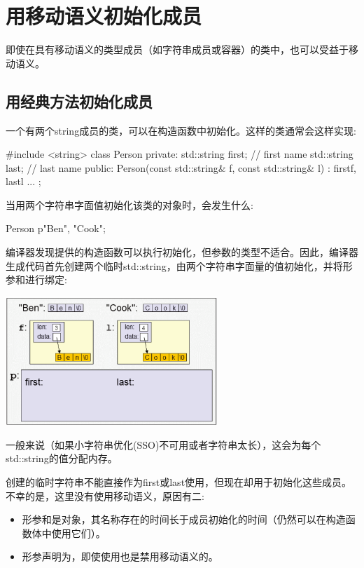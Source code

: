 \section{用移动语义初始化成员}
即使在具有移动语义的类型成员（如字符串成员或容器）的类中，也可以受益于移动语义。

\subsection{用经典方法初始化成员}

一个有两个string成员的类，可以在构造函数中初始化。这样的类通常会这样实现:

\begin{cppcode}
#include <string>
class Person {
private:
	std::string first; // first name
	std::string last; // last name
public:
	Person(const std::string& f, const std::string& l)
	: first{f}, last{l} {
	}
	...
};
\end{cppcode}

当用两个字符串字面值初始化该类的对象时，会发生什么:

\begin{cppcode}
Person p{"Ben", "Cook"};
\end{cppcode}

编译器发现提供的构造函数可以执行初始化，但参数的类型不适合。因此，编译器生成代码首先创建两个临时std::string，由两个字符串字面量的值初始化，并将形参和进行绑定:

\begin{center}
	\includegraphics[width=0.6\textwidth]{part1/ch4/images/1}
\end{center}

一般来说（如果小字符串优化(SSO)不可用或者字符串太长），这会为每个std::string的值分配内存。

创建的临时字符串不能直接作为first或last使用，但现在却用于初始化这些成员。不幸的是，这里没有使用移动语义，原因有二:

\begin{itemize}
	\item 形参和是对象，其名称存在的时间长于成员初始化的时间（仍然可以在构造函数体中使用它们）。
	\item 形参声明为，即使使用也是禁用移动语义的。
\end{itemize}

